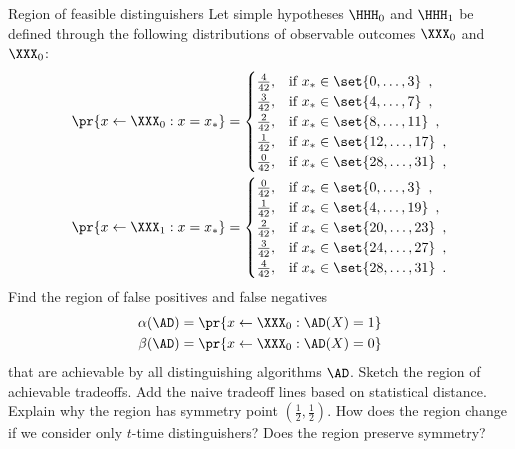 \documentclass{crypto-exercise}
\author{Sven Laur}
\begin{document}
\begin{exercise}{Region of feasible distinguishers}
Let simple hypotheses $\HHH_0$ and $\HHH_1$ be defined through the following distributions of observable outcomes $\XXX_0$ and $\XXX_0$:
\begin{align*}
\pr{x\gets\XXX_0:x=x_*}&=
\begin{cases}
 \frac{4}{42}, &\text{if } x_*\in\set{0,\ldots, 3}  \enspace,\\
 \frac{3}{42}, &\text{if } x_*\in\set{4,\ldots, 7}  \enspace,\\ 
 \frac{2}{42}, &\text{if } x_*\in\set{8,\ldots, 11} \enspace,\\ 
 \frac{1}{42}, &\text{if } x_*\in\set{12,\ldots, 17}\enspace,\\ 
 \frac{0}{42}, &\text{if } x_*\in\set{28,\ldots, 31}\enspace,\\
\end{cases}\\
\pr{x\gets\XXX_1:x=x_*}&=
\begin{cases}
 \frac{0}{42}, &\text{if } x_*\in\set{0,\ldots, 3}  \enspace,\\
 \frac{1}{42}, &\text{if } x_*\in\set{4,\ldots, 19}  \enspace,\\ 
 \frac{2}{42}, &\text{if } x_*\in\set{20,\ldots, 23} \enspace,\\ 
 \frac{3}{42}, &\text{if } x_*\in\set{24,\ldots, 27}\enspace,\\ 
 \frac{4}{42}, &\text{if } x_*\in\set{28,\ldots, 31}\enspace.\\
\end{cases}
\end{align*}
Find the region of false positives and false negatives
\begin{align*}
\alpha(\AD)&=\pr{x\gets\XXX_0:\AD(X)=1}\\
\beta(\AD)&=\pr{x\gets\XXX_0:\AD(X)=0}
\end{align*}
that are achievable by all distinguishing algorithms $\AD$. Sketch the region of achievable tradeoffs. Add the naive tradeoff lines based on statistical distance. Explain why the region has symmetry point $(\frac{1}{2}, \frac{1}{2})$. How does the region change if we consider only $t$-time distinguishers? Does  the region preserve symmetry?   

\end{exercise}


\begin{solution}
\end{solution}
\end{document}
